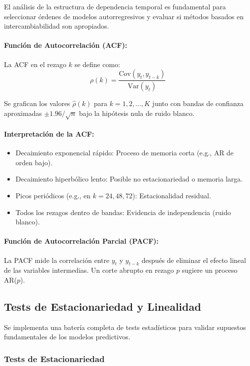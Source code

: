 El análisis de la estructura de dependencia temporal es fundamental para seleccionar órdenes de modelos autorregresivos y evaluar si métodos basados en intercambiabilidad son apropiados.

\paragraph{Función de Autocorrelación (ACF):} La ACF en el rezago $k$ se define como:
\begin{equation}
\rho(k) = \frac{\text{Cov}(y_t, y_{t-k})}{\text{Var}(y_t)}
\label{eq:acf}
\end{equation}

Se grafican los valores $\hat{\rho}(k)$ para $k = 1, 2, \ldots, K$ junto con bandas de confianza aproximadas $\pm 1.96/\sqrt{n}$ bajo la hipótesis nula de ruido blanco.

\paragraph{Interpretación de la ACF:}
\begin{itemize}
\item Decaimiento exponencial rápido: Proceso de memoria corta (e.g., AR de orden bajo).
\item Decaimiento hiperbólico lento: Posible no estacionariedad o memoria larga.
\item Picos periódicos (e.g., en $k = 24, 48, 72$): Estacionalidad residual.
\item Todos los rezagos dentro de bandas: Evidencia de independencia (ruido blanco).
\end{itemize}

\paragraph{Función de Autocorrelación Parcial (PACF):} La PACF mide la correlación entre $y_t$ y $y_{t-k}$ después de eliminar el efecto lineal de las variables intermedias. Un corte abrupto en rezago $p$ sugiere un proceso AR($p$).

\subsection{Tests de Estacionariedad y Linealidad}
\label{subsec:eda_tests}

Se implementa una batería completa de tests estadísticos para validar supuestos fundamentales de los modelos predictivos.
\subsubsection{Tests de Estacionariedad}

